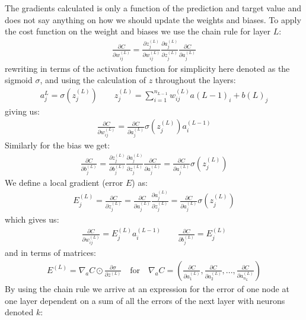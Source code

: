 \documentclass[11pt]{article}
\begin{document}
The gradients calculated is only a function of the prediction and target value and does not say anything on how we should update the weights and biases. To apply the cost function on the weight and biases we use the chain rule for layer $L$:
\begin{align*}
    \frac{\partial C}{\partial w^{(L)}_{ij}}  = \frac{\partial z^{(L)}_j}{\partial w^{(L)}_{ij}}  \frac{\partial a^{(L)}_{j}}{\partial z^{(L)}_j}  \frac{\partial C}{\partial a^{(L)}_j}
\end{align*}
rewriting in terms of the activation function for simplicity here denoted as the sigmoid $\sigma$, and using the calculation of $z$ throughout the layers:
\begin{align*}
    a_j^L = \sigma(z_j^{(L)}) \quad\quad z_j^{(L)} = \sum_{i=1}^{n_{L-1}}w^{(L)}_{ij}a{(L-1)}_{i} + b{(L)}_{j}
\end{align*}
giving us:
\begin{align*}
    \frac{\partial C}{\partial w^{(L)}_{ij}} = \frac{\partial C}{\partial a^{(L)}_{j}}\sigma(z_j^{(L)})a_i^{(L-1)}
\end{align*}
Similarly for the bias we get:
\begin{align*}
    \frac{\partial C}{\partial b^{(L)}_{j}} = \frac{\partial z^{(L)}_j}{\partial b^{(L)}_{j}}  \frac{\partial a^{(L)}_{j}}{\partial z^{(L)}_j}  \frac{\partial C}{\partial a^{(L)}_j} =
    \frac{\partial C}{\partial a^{(L)}_{j}}\sigma(z_j^{(L)})
\end{align*}
We define a local gradient (error $E$) as:
\begin{align*}
    E_j^{(L)} = \frac{\partial C }{\partial z_j^{(L)}} = \frac{\partial C }{\partial a_j^{(L)}}\frac{\partial a_j^{(L)} }{\partial z_j^{(L)}} = \frac{\partial C }{\partial a_j^{(L)}} \sigma(z_j^{(L)})
\end{align*}
which gives us:
\begin{align*}
    \frac{\partial C }{\partial w_{ij}^{(L)}} = E_j^{(L)} a_i^{(L-1)} \quad\quad
    \frac{\partial C }{\partial b_{j}^{(L)}} = E_j^{(L)}
\end{align*}
and in terms of matrices:
\begin{align*}
    E^{(L)} = \nabla_a C \odot \frac{\partial \sigma }{\partial z^{(L)}} \quad \text{for} \quad \nabla_a C = \left(\frac{\partial C }{\partial a_1^{(L)}}, \frac{\partial C }{\partial a_2^{(L)}},..., \frac{\partial C }{\partial a_{n_L}^{(L)}}\right)
\end{align*}
By using the chain rule we arrive at an expression for the error of one node at one layer dependent on a sum of all the errors of the next layer with neurons denoted $k$:
\end{document}
